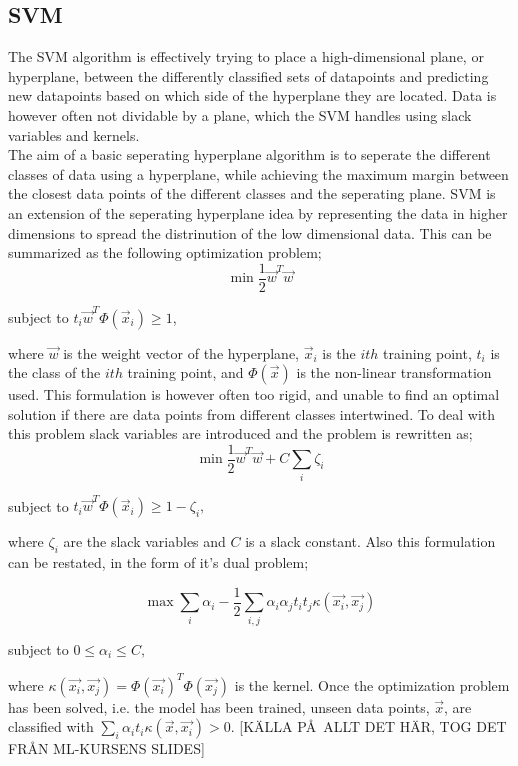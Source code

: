 \documentclass{article}
\begin{document}
\subsection{SVM}
The SVM algorithm is effectively trying to place a high-dimensional plane, or hyperplane, between the differently classified sets of datapoints and predicting new datapoints based on which side of the hyperplane they are located. Data is however often not dividable by a plane, which the SVM handles using slack variables and kernels. \\
The aim of a basic seperating hyperplane algorithm is to seperate the different classes of data using a hyperplane, while achieving the maximum margin between the closest data points of the different classes and the seperating plane. SVM is an extension of the seperating hyperplane idea by representing the data in higher dimensions to spread the distrinution of the low dimensional data. This can be summarized as the following optimization problem;
\begin{equation}
\min \frac{1}{2}\vec{w}^{T}\vec{w}
\end{equation} 
\begin{center}
 subject to  $t_i \vec{w}^{T} \Phi(\vec{x}_i)  \geq 1$,  \\
\end{center}
where $\vec{w}$ is the weight vector of the hyperplane, $\vec{x}_i$ is the $ith$ training point, $t_i$ is the class of the $ith$ training point, and $\Phi(\vec{x})$ is the non-linear transformation used. This formulation is however often too rigid, and unable to find an optimal solution if there are data points from different classes intertwined. To deal with this problem slack variables are introduced and the problem is rewritten as; 
\begin{equation}
\min \frac{1}{2}\vec{w}^{T}\vec{w} + C\sum\limits_i \zeta_i 
\end{equation}
\begin{center}
subject to $t_i \vec{w}^{T} \Phi(\vec{x}_i)  \geq 1 - \zeta_i, $
\end{center}
where $\zeta_i$ are the slack variables and $C$ is a slack constant. Also this formulation can be restated, in the form of it's dual problem;

\begin{equation}
\max \sum\limits_i \alpha_i - \frac{1}{2}\sum\limits_{i,j} \alpha_i \alpha_j t_i t_j \kappa (\vec{x_i}, \vec{x_j}) 
\end{equation}
\begin{center}
subject to $0 \leq \alpha_i \leq C, $
\end{center}
where $\kappa (\vec{x_i}, \vec{x_j}) = \Phi(\vec{x_i})^T \Phi(\vec{x_j})$ is the kernel. Once the optimization problem has been solved, i.e. the model has been trained, unseen data points, $\vec{x}$,  are classified with $\sum\limits_i \alpha_i t_i \kappa(\vec{x},\vec{x_i}) > 0$. [K\"ALLA P\AA\ ALLT DET H\"AR, TOG DET FR\AA N ML-KURSENS SLIDES]
\end{document}
